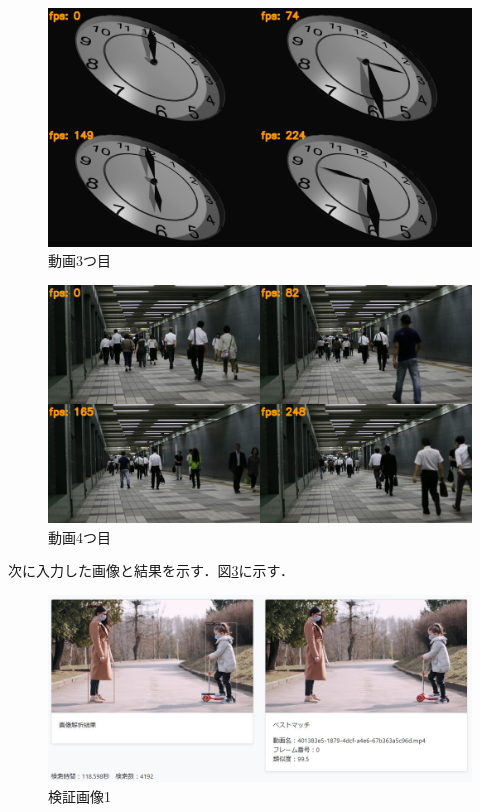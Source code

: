 \documentclass[a4j,12pt,dvipdfmx]{jreport}
\begin{document}
\begin{figure}[H]
  \centering
  \includegraphics[width=13cm]{image/3_result.jpg}
  \caption{動画3つ目}
  \label{fig:movie3}
\end{figure}

\begin{figure}[H]
  \centering
  \includegraphics[width=13cm]{image/4_result.jpg}
  \caption{動画4つ目}
  \label{fig:movie4}
\end{figure}

次に入力した画像と結果を示す．図\ref{fig:img_1-1}に示す．
\begin{figure}[b]
  \centering
  \includegraphics[width=13cm]{image/result_1_1.jpg}
  \caption{検証画像1}
  \label{fig:img_1-1}
\end{figure}
\end{document}
